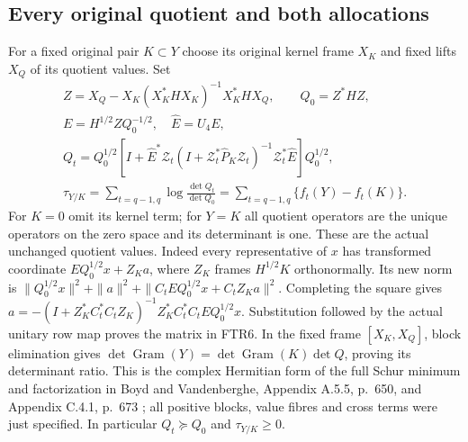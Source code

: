 \documentclass[11pt,a4paper]{article}
\begin{document}
\subsection{Every original quotient and both allocations}
For a fixed original pair $K\subset Y$ choose its original kernel
frame $X_K$ and fixed lifts $X_Q$ of its quotient values. Set
\[
\begin{gathered}
 Z=X_Q-X_K(X_K^*HX_K)^{-1}X_K^*HX_Q,\qquad Q_0=Z^*HZ,\\
 E=H^{1/2}ZQ_0^{-1/2},\quad \widehat E=U_4E,\\
 Q_t=Q_0^{1/2}\left[I+\widehat E^*\mathscr Z_t
 (I+\mathscr Z_t^*\widehat P_K\mathscr Z_t)^{-1}
                  \mathscr Z_t^*\widehat E\right]Q_0^{1/2},\\
 \tau_{Y/K}=\sum_{t=q-1,q}\log\frac{\det Q_t}{\det Q_0}
            =\sum_{t=q-1,q}\{f_t(Y)-f_t(K)\}.             \tag{FTR6}
\end{gathered}
\]
For $K=0$ omit its kernel term; for $Y=K$ all quotient operators
are the unique operators on the zero space and its determinant is
one. These are the actual unchanged quotient values. Indeed every
representative of $x$ has transformed coordinate
$EQ_0^{1/2}x+Z_Ka$, where $Z_K$ frames $H^{1/2}K$
orthonormally. Its new norm is
$\|Q_0^{1/2}x\|^2+\|a\|^2+
\|C_tEQ_0^{1/2}x+C_tZ_Ka\|^2$.
Completing the square gives
$a=-(I+Z_K^*C_t^*C_tZ_K)^{-1}Z_K^*C_t^*C_tEQ_0^{1/2}x$.
Substitution followed by the actual unitary row map proves the
matrix in FTR6. In the fixed frame $[X_K,X_Q]$, block elimination
gives $\det\operatorname{Gram}(Y)=
\det\operatorname{Gram}(K)\det Q$, proving its determinant ratio.
This is the complex Hermitian form of the full Schur minimum and
factorization in Boyd and Vandenberghe, Appendix A.5.5, p.~650,
and Appendix C.4.1, p.~673 \cite{human:boyd-vandenberghe}; all
positive blocks, value fibres and cross terms were just specified.
In particular $Q_t\succeq Q_0$ and $\tau_{Y/K}\ge0$.
\end{document}
